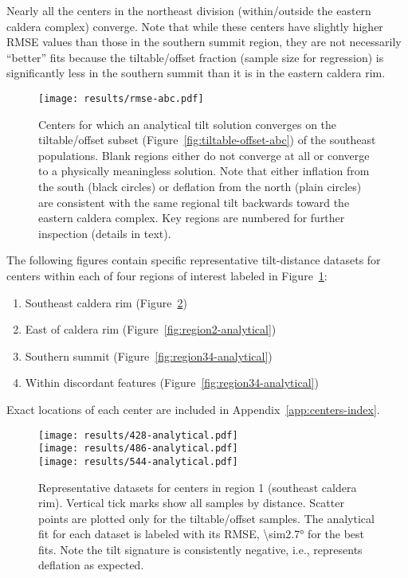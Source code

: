 Nearly all the centers in the northeast division (within/outside the eastern caldera complex) converge. Note that while these centers have slightly higher \acs{RMSE} values than those in the southern summit region, they are not necessarily ``better'' fits because the tiltable/offset fraction (sample size for regression) is significantly less in the southern summit than it is in the eastern caldera rim.

\begin{figure}
    \texttt{[image: results/rmse-abc.pdf]}%
    \caption[Centers by analytical convergence]{Centers for which an analytical tilt solution converges on the tiltable/offset subset (Figure~\ref{fig:tiltable-offset-abc}) of the southeast populations. Blank regions either do not converge at all or converge to a physically meaningless solution. Note that either inflation from the south (black circles) or deflation from the north (plain circles) are consistent with the same regional tilt backwards toward the eastern caldera complex. Key regions are numbered for further inspection (details in text).}%
    \label{fig:rmse-abc}
\end{figure}

The following figures contain specific representative tilt-distance datasets for centers within each of four regions of interest labeled in Figure~\ref{fig:rmse-abc}:

\begin{enumerate}
    \item Southeast caldera rim (Figure~\ref{fig:region1-analytical})
    \item East of caldera rim (Figure~\ref{fig:region2-analytical})
    \item Southern summit (Figure~\ref{fig:region34-analytical})
    \item Within discordant features (Figure~\ref{fig:region34-analytical})
\end{enumerate}
Exact locations of each center are included in Appendix~\ref{app:centers-index}.

\begin{figure}
    \vspace{-15pt}
    \texttt{[image: results/428-analytical.pdf]}\\
    \texttt{[image: results/486-analytical.pdf]}\\
    \texttt{[image: results/544-analytical.pdf]}%
    \caption[Southeast caldera rim: analytical fit]{Representative datasets for centers in region 1 (southeast caldera rim). Vertical tick marks show all samples by  distance. Scatter points are plotted only for the tiltable/offset samples. The analytical fit for each dataset is labeled with its \acs{RMSE}, \ang{\sim2.7} for the best fits. Note the tilt signature is consistently negative, i.e., represents deflation as expected.}
    \label{fig:region1-analytical}
\end{figure}

